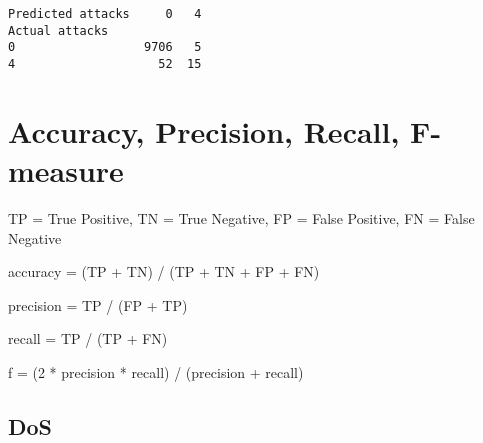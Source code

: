 \documentclass[11pt]{article}
\makeatletter
\newcommand{\boxspacing}{\kern\kvtcb@left@rule\kern\kvtcb@boxsep}
\newcommand{\prompt}[4]{
        {\ttfamily\llap{{\color{#2}[#3]:\hspace{3pt}#4}}\vspace{-\baselineskip}}
    }
\makeatother
\begin{document}
            \begin{tcolorbox}[breakable, size=fbox, boxrule=.5pt, pad at break*=1mm, opacityfill=0]
\prompt{Out}{outcolor}{66}{\boxspacing}
\begin{Verbatim}[commandchars=\\\{\}]
Predicted attacks     0   4
Actual attacks
0                  9706   5
4                    52  15
\end{Verbatim}
\end{tcolorbox}
        
    \hypertarget{accuracy-precision-recall-f-measure}{%
\section{Accuracy, Precision, Recall,
F-measure}\label{accuracy-precision-recall-f-measure}}

    TP = True Positive, TN = True Negative, FP = False Positive, FN = False
Negative

accuracy = (TP + TN) / (TP + TN + FP + FN)

precision = TP / (FP + TP)

recall = TP / (TP + FN)

f = (2 * precision * recall) / (precision + recall)

    \hypertarget{dos}{%
\subsection{DoS}\label{dos}}
\end{document}
